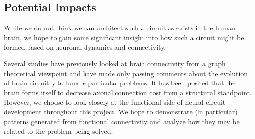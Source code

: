 \subsection{Potential Impacts}

While we do not think we can architect such a circuit as exists in the human
brain, we hope to gain some significant insight into how such a circuit might be
formed based on neuronal dynamics and connectivity.

Several studies have previously looked at brain connectivity from a graph
theoretical viewpoint \cite{Structure-Functional} and have made only passing
comments about the evolution of brain circuitry to handle particular problems.
It has been posited that the brain forms itself to decrease axonal connection
cost from a structural standpoint. However, we choose to look closely at the
functional side of neural circuit development throughout this project. We hope
to demonstrate (in particular) patterns generated from functional connectivity
and analyze how they may be related to the problem being solved.
